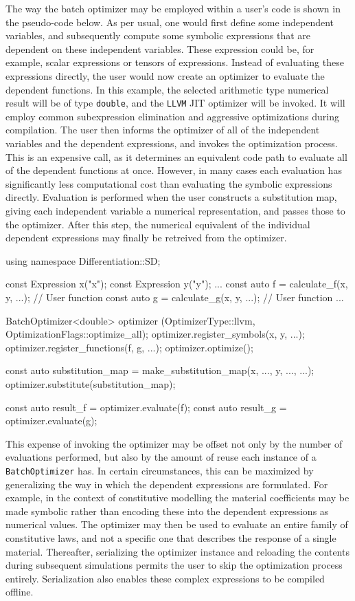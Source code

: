 \documentclass{ansarticle-preprint}
\begin{document}
The way the batch optimizer may be employed within a user's code is shown
in the pseudo-code below.
As per usual, one would first define some independent variables, and 
subsequently compute some symbolic expressions that are dependent on these 
independent variables. 
These expression could be, for example, scalar  expressions or tensors of 
expressions.
Instead of evaluating these expressions directly, the user would now create an
optimizer to evaluate the dependent functions.
In this example, the selected arithmetic type numerical result will be of type
\texttt{double}, and the \texttt{LLVM} JIT optimizer will be invoked.
It will employ common subexpression elimination and aggressive optimizations
during compilation.
The user then informs the optimizer of all of the independent variables and the
dependent expressions, and invokes the optimization process.
This is an expensive call, as it determines an equivalent code path to evaluate
all of the dependent functions at once.
However, in many cases each evaluation has significantly less computational cost
than evaluating the symbolic expressions directly.
Evaluation is performed when the user constructs a substitution map, giving each
independent variable a numerical representation, and passes those to the 
optimizer.
After this step, the numerical equivalent of the individual dependent expressions
may finally be retreived from the optimizer.

\begin{c++}
using namespace Differentiation::SD;

const Expression x("x");
const Expression y("y");
...
const auto f = calculate_f(x, y, ...); // User function
const auto g = calculate_g(x, y, ...); // User function
...

BatchOptimizer<double> optimizer (OptimizerType::llvm,
                                  OptimizationFlags::optimize_all);
optimizer.register_symbols(x, y, ...);
optimizer.register_functions(f, g, ...);
optimizer.optimize();

const auto substitution_map
  = make_substitution_map({x, ...}, {y, ...}, ...);
optimizer.substitute(substitution_map);

const auto result_f = optimizer.evaluate(f);
const auto result_g = optimizer.evaluate(g);
\end{c++}

This expense of invoking the optimizer may be offset not only by
the number of evaluations performed, but also by the amount of reuse each
instance of a \texttt{BatchOptimizer} has.
In certain circumstances, this can be maximized by generalizing the way in which
the dependent expressions are formulated.
For example, in the context of constitutive modelling the material coefficients
may be made symbolic rather than encoding these into the dependent expressions
as numerical values.
The optimizer may then be used to evaluate an entire family of constitutive laws,
and not a specific one that describes the response of a single material.
Thereafter, serializing the optimizer instance and reloading the contents during
subsequent simulations permits the user to skip the optimization process entirely.
Serialization also enables these complex expressions to be compiled offline.
\end{document}
